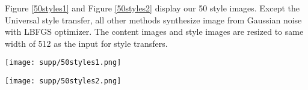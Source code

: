 Figure \ref{50styles1} and Figure \ref{50styles2} display our 50 style images. Except the Universal style transfer, all other methods synthesize image from Gaussian noise with LBFGS optimizer. The content images and style images are resized to same width of 512 as the input for style transfers. 
\begin{figure*}[bt]
\centering
  \texttt{[image: supp/50styles1.png]}
\caption{\em The first group of 50 styles.     }
\label{50styles1}
\vspace{-3mm}
\end{figure*}

\begin{figure*}[bt]
\centering
  \texttt{[image: supp/50styles2.png]}
\caption{\em The second group of 50 styles.     }
\label{50styles2}
\vspace{-3mm}
\end{figure*}
\FloatBarrier
